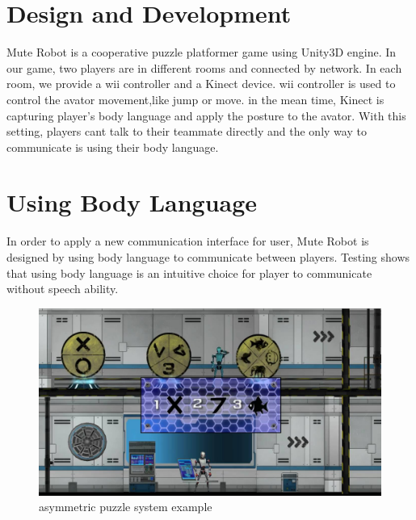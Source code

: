 \documentclass{chi-ext}
\begin{document}
\section{Design and Development}
Mute Robot is a cooperative puzzle platformer game using Unity3D engine\cite{Unity3D}. In our game, two players are in different rooms and connected by network. In each room, we provide a wii controller and a Kinect\cite{Kinect} device. wii\cite{Wii} controller is used to control the avator movement,like jump or move. in the mean time, Kinect is capturing player’s body language and apply the posture to the avator. With this setting, players cant talk to their teammate directly and the only way to communicate is using  their body language.





\section{Using Body Language}
In order to apply a new communication interface for user, Mute Robot is designed by using body language to communicate between players. Testing shows that using body language is an intuitive choice for player to communicate without speech ability.

\begin{figure}
  \centering
  \includegraphics[width=\linewidth]{figures/Figure1.jpg}
  \caption{asymmetric puzzle system example}
  \label{fig:Figure1}
\end{figure}
\end{document}
